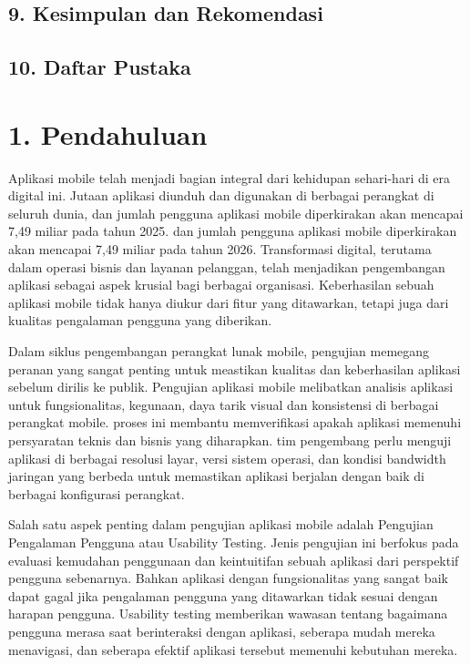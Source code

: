 \documentclass[a4paper, 12pt]{article}
\begin{document}
\subsection*{9. Kesimpulan dan Rekomendasi}
\subsection*{10. Daftar Pustaka}

\section*{1. Pendahuluan}
Aplikasi mobile telah menjadi bagian integral dari kehidupan sehari-hari di era digital ini. Jutaan aplikasi diunduh dan digunakan di berbagai perangkat di seluruh dunia, dan jumlah pengguna aplikasi mobile diperkirakan akan mencapai 7,49 miliar pada tahun 2025. dan jumlah pengguna aplikasi mobile diperkirakan akan mencapai 7,49 miliar pada tahun 2026. Transformasi digital, terutama dalam operasi bisnis dan layanan pelanggan, telah menjadikan pengembangan aplikasi sebagai aspek krusial bagi berbagai organisasi. Keberhasilan sebuah aplikasi mobile tidak hanya diukur dari fitur yang ditawarkan, tetapi juga dari kualitas pengalaman pengguna yang diberikan. 

Dalam siklus pengembangan perangkat lunak mobile, pengujian memegang peranan yang sangat penting untuk meastikan kualitas dan keberhasilan aplikasi sebelum dirilis ke publik. Pengujian aplikasi mobile melibatkan analisis aplikasi untuk fungsionalitas, kegunaan, daya tarik visual dan konsistensi di berbagai perangkat mobile. proses ini membantu memverifikasi apakah aplikasi memenuhi persyaratan teknis dan bisnis yang diharapkan. tim pengembang perlu menguji aplikasi di berbagai resolusi layar, versi sistem operasi, dan kondisi bandwidth jaringan yang berbeda untuk memastikan aplikasi berjalan dengan baik di berbagai konfigurasi perangkat. 

Salah satu aspek penting dalam pengujian aplikasi mobile adalah Pengujian Pengalaman Pengguna atau Usability Testing. Jenis pengujian ini berfokus pada evaluasi kemudahan penggunaan dan keintuitifan sebuah aplikasi dari perspektif pengguna sebenarnya. Bahkan aplikasi dengan fungsionalitas yang sangat baik dapat gagal jika pengalaman pengguna yang ditawarkan tidak sesuai dengan harapan pengguna. Usability testing memberikan wawasan tentang bagaimana pengguna merasa saat berinteraksi dengan aplikasi, seberapa mudah mereka menavigasi, dan seberapa efektif aplikasi tersebut memenuhi kebutuhan mereka.
\end{document}

